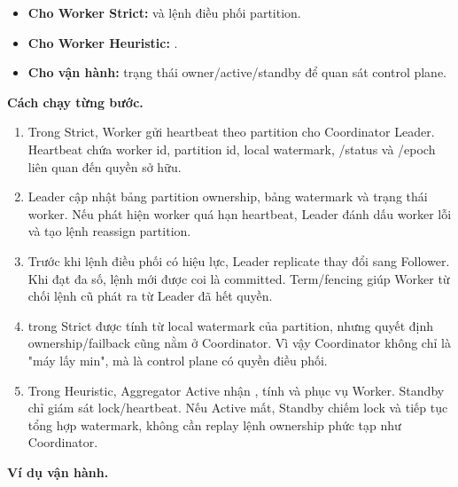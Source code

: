 \documentclass[12pt,a4paper]{article}
\begin{document}
\begin{itemize}
\item \textbf{Cho Worker Strict:}  và lệnh điều phối partition.
\item \textbf{Cho Worker Heuristic:} .
\item \textbf{Cho vận hành:} trạng thái owner/active/standby để quan sát control plane.
\end{itemize}
\textbf{Cách chạy từng bước.}

\begin{enumerate}
\item Trong Strict, Worker gửi heartbeat theo partition cho Coordinator Leader. Heartbeat chứa worker id, partition id, local watermark, /status và /epoch liên quan đến quyền sở hữu.
\item Leader cập nhật bảng partition ownership, bảng watermark và trạng thái worker. Nếu phát hiện worker quá hạn heartbeat, Leader đánh dấu worker lỗi và tạo lệnh reassign partition.
\item Trước khi lệnh điều phối có hiệu lực, Leader replicate thay đổi sang Follower. Khi đạt đa số, lệnh mới được coi là committed. Term/fencing giúp Worker từ chối lệnh cũ phát ra từ Leader đã hết quyền.
\item {} trong Strict được tính từ local watermark của partition, nhưng quyết định ownership/failback cũng nằm ở Coordinator. Vì vậy Coordinator không chỉ là "máy lấy min", mà là control plane có quyền điều phối.
\item Trong Heuristic, Aggregator Active nhận , tính  và phục vụ Worker. Standby chỉ giám sát lock/heartbeat. Nếu Active mất, Standby chiếm lock và tiếp tục tổng hợp watermark, không cần replay lệnh ownership phức tạp như Coordinator.
\end{enumerate}
\textbf{Ví dụ vận hành.}
\end{document}
